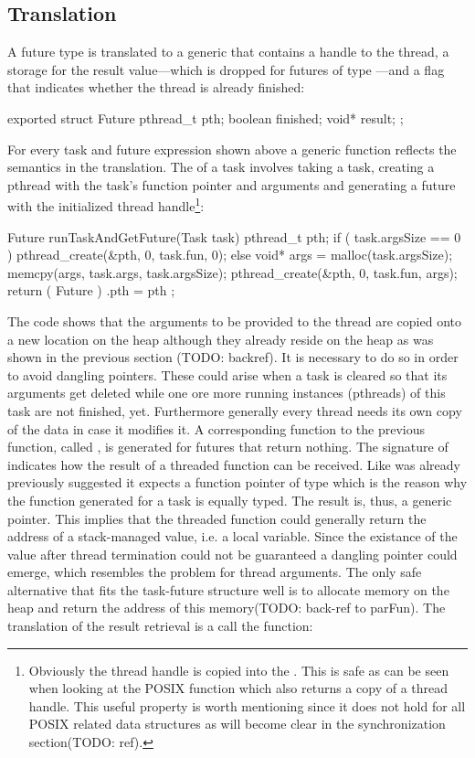 \subsection{Translation}
A future type  is translated to a generic  that contains a handle to the thread, a storage for the result value---which is dropped for futures of type ---and a flag that indicates whether the thread is already finished:
\begin{ccode}
exported struct Future { 
  pthread_t pth; 
  boolean finished; 
  void* result; 
};
\end{ccode}

For every task and future expression shown above a generic function reflects the semantics in the translation. The  of a task involves taking a task, creating a pthread with the task's function pointer and arguments and generating a future with the initialized thread handle\footnote{Obviously the thread handle is copied into the . This is safe as can be seen when looking at the POSIX function  which also returns a copy of a thread handle. This useful property is worth mentioning since it does not hold for all POSIX related data structures as will become clear in the synchronization section(TODO: ref).}:
\begin{ccode}
Future runTaskAndGetFuture(Task task) { 
  pthread_t pth;
  if ( task.argsSize == 0 ) {
      pthread_create(&pth, 0, task.fun, 0);
  } else {
    void* args = malloc(task.argsSize);
    memcpy(args, task.args, task.argsSize);
    pthread_create(&pth, 0, task.fun, args);
  }
  return ( Future ){ .pth = pth }; 
}
\end{ccode}
The code shows that the arguments to be provided to the thread are copied onto a new location on the heap although they already reside on the heap as was shown in the previous section (TODO: backref). It is necessary to do so in order to avoid dangling pointers. These could arise when a task is cleared so that its arguments get deleted while one ore more running instances (pthreads) of this task are not finished, yet. Furthermore generally every thread needs its own copy of the data in case it modifies it. A corresponding function to the previous function, called , is generated for futures that return nothing. The signature of  indicates how the result of a threaded function can be received. Like was already previously suggested it expects a function pointer of type  which is the reason why the function generated for a task is equally typed. The result is, thus, a generic  pointer. This implies that the threaded function could generally return the address of a stack-managed value, i.e. a local variable. Since the existance of the value after thread termination could not be guaranteed a dangling pointer\cite{UnderstandingAndUsingCPointers} could emerge, which resembles the problem for thread arguments. The only safe alternative that fits the task-future structure well is to allocate memory on the heap and return the address of this memory(TODO: back-ref to parFun). The translation of the result retrieval is a call the function:

